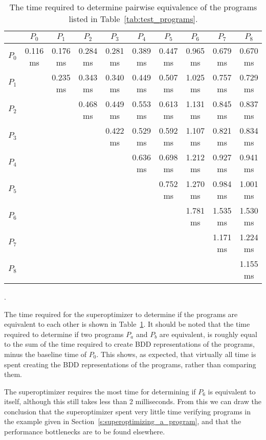 \documentclass[a4paper,11pt]{kth-mag}
\begin{document}
\begin{table}
\centering
\tiny
\setlength{\tabcolsep}{3pt}
\begin{tabular}{l|*{9}{c}}
      & $P_0$    & $P_1$    & $P_2$    & $P_3$    & $P_4$    & $P_5$    & $P_6$    & $P_7$    & $P_8$    \\
\hline
$P_0$ & 0.116 ms & 0.176 ms & 0.284 ms & 0.281 ms & 0.389 ms & 0.447 ms & 0.965 ms & 0.679 ms & 0.670 ms \\
$P_1$ &          & 0.235 ms & 0.343 ms & 0.340 ms & 0.449 ms & 0.507 ms & 1.025 ms & 0.757 ms & 0.729 ms \\
$P_2$ &          &          & 0.468 ms & 0.449 ms & 0.553 ms & 0.613 ms & 1.131 ms & 0.845 ms & 0.837 ms \\
$P_3$ &          &          &          & 0.422 ms & 0.529 ms & 0.592 ms & 1.107 ms & 0.821 ms & 0.834 ms \\
$P_4$ &          &          &          &          & 0.636 ms & 0.698 ms & 1.212 ms & 0.927 ms & 0.941 ms \\
$P_5$ &          &          &          &          &          & 0.752 ms & 1.270 ms & 0.984 ms & 1.001 ms \\
$P_6$ &          &          &          &          &          &          & 1.781 ms & 1.535 ms & 1.530 ms \\
$P_7$ &          &          &          &          &          &          &          & 1.171 ms & 1.224 ms \\
$P_8$ &          &          &          &          &          &          &          &          & 1.155 ms \\
\end{tabular}
\caption{The time required to determine pairwise equivalence of the programs listed in Table~\ref{tab:test_programs}.}.
\label{tab:performance2}
\end{table}

The time required for the superoptimizer to determine if the programs are equivalent to each other is shown in Table~\ref{tab:performance2}.
It should be noted that the time required to determine if two programs $P_a$ and $P_b$ are equivalent, is roughly equal to the sum of the time required to create BDD representations of the programs, minus the baseline time of $P_0$.
This shows, as expected, that virtually all time is spent creating the BDD representations of the programs, rather than comparing them.

The superoptimizer requires the most time for determining if $P_6$ is equivalent to itself, although this still takes less than 2 milliseconds.
From this we can draw the conclusion that the superoptimizer spent very little time verifying programs in the example given in Section~\ref{s:superoptimizing_a_program}, and that the performance bottlenecks are to be found elsewhere.
\end{document}
